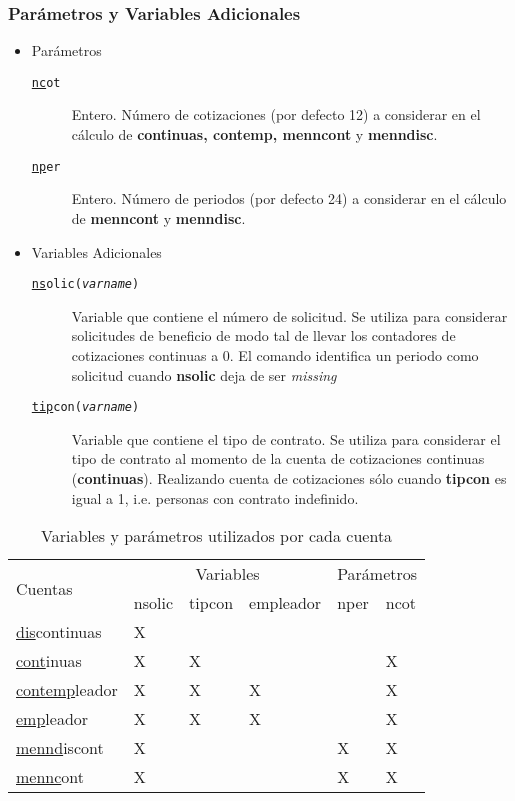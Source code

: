 \documentclass[8pt]{beamer}
\begin{document}
\begin{frame}
\frametitle{Parámetros y Variables Adicionales\label{diapo:parametros}}
\pause
\begin{itemize}
\item Parámetros
\begin{description}
\item [\tt \uline{nc}ot]Entero. Número de cotizaciones (por defecto 12) a considerar en el cálculo de {\bf continuas, contemp, menncont} y {\bf menndisc}.
\item [\tt \uline{np}er]Entero. Número de periodos (por defecto 24) a considerar en el cálculo de {\bf menncont} y {\bf menndisc}.
\end{description}
\pause
\item Variables Adicionales
\begin{description}
\item [\tt \uline{ns}olic({\it varname})] Variable que contiene el número de solicitud. Se utiliza para considerar solicitudes de beneficio de modo tal de llevar los contadores de cotizaciones continuas a 0. El comando identifica un periodo como solicitud cuando {\bf nsolic} deja de ser {\it missing}
\item [\tt \uline{tip}con({\it varname})] Variable que contiene el tipo de contrato.  Se utiliza para considerar el tipo de contrato al momento de la cuenta de cotizaciones continuas ({\bf continuas}). Realizando cuenta de cotizaciones sólo cuando {\bf tipcon} es igual a 1, i.e. personas con contrato indefinido.
\end{description}
\end{itemize}
\end{frame}

\begin{frame}
\begin{table}
\caption{Variables y parámetros utilizados por cada cuenta\label{tab:efectos}}
\begin{tabular}{m{}*{5}{m{40pt}<{\centering}}}
\toprule
\multirow{2}{*}{Cuentas} & \multicolumn{3}{c}{Variables} & \multicolumn{2}{c}{Parámetros} \\
\cmidrule(r){2-4} \cmidrule(r){5-6}
& nsolic & tipcon & empleador & nper & ncot \\
\midrule
\uline{dis}continuas & X & & & &  \\
\uline{cont}inuas & X & X & & & X \\
\uline{contemp}leador & X & X & X & & X \\
\uline{emp}leador & X & X & X & & X \\
\uline{mennd}iscont & X & & & X & X \\
\uline{mennc}ont & X & & & X & X \\
\bottomrule
\end{tabular}
\end{table}
\end{frame}
\end{document}
